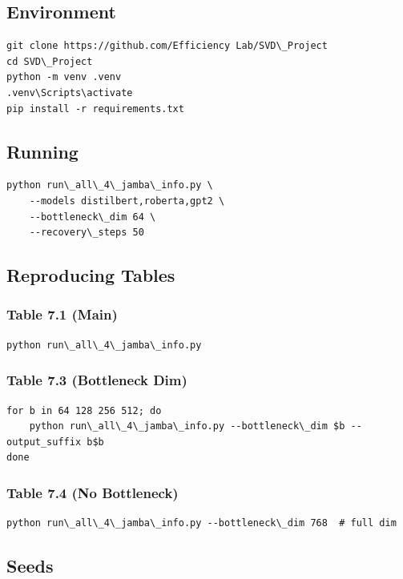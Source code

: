 \subsection{Environment}

\begin{lstlisting}
git clone https://github.com/Efficiency Lab/SVD\_Project
cd SVD\_Project
python -m venv .venv
.venv\Scripts\activate
pip install -r requirements.txt
\end{lstlisting}

\subsection{Running}

\begin{lstlisting}
python run\_all\_4\_jamba\_info.py \
    --models distilbert,roberta,gpt2 \
    --bottleneck\_dim 64 \
    --recovery\_steps 50
\end{lstlisting}

\subsection{Reproducing Tables}

\subsubsection{Table 7.1 (Main)}
\begin{lstlisting}
python run\_all\_4\_jamba\_info.py
\end{lstlisting}

\subsubsection{Table 7.3 (Bottleneck Dim)}
\begin{lstlisting}
for b in 64 128 256 512; do
    python run\_all\_4\_jamba\_info.py --bottleneck\_dim $b --output_suffix b$b
done
\end{lstlisting}

\subsubsection{Table 7.4 (No Bottleneck)}
\begin{lstlisting}
python run\_all\_4\_jamba\_info.py --bottleneck\_dim 768  # full dim
\end{lstlisting}

\subsection{Seeds}

